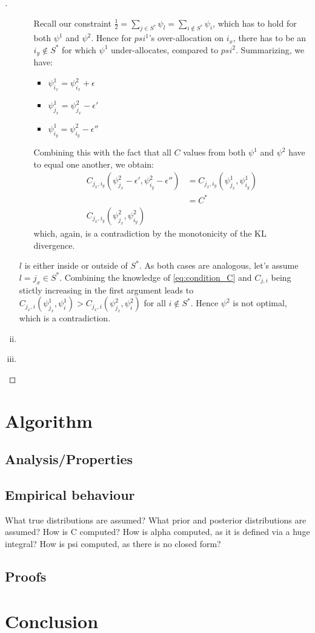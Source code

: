 \begin{proof}[]
\begin{enumerate}[(i)]
\begin{itemize}
      Recall our constraint $\frac{1}{2} = \sum_{j \in S^*} \psi_l = \sum_{i \notin S^*} \psi_i$, which has to hold for both $\psi^1$ and $\psi^2$.
      Hence for $psi^1$'s over-allocation on $i_x$, there has to be an $i_y \notin S^*$ for which $\psi^1$ under-allocates, compared to $psi^2$.
      Summarizing, we have:
      \begin{itemize}
        \item $\psi^1_{i_x} = \psi^2_{i_x} + \epsilon$
        \item $\psi^1_{j_x} = \psi^2_{j_x} - \epsilon'$
        \item $\psi^1_{i_y} = \psi^2_{i_y} - \epsilon''$
      \end{itemize}
      Combining this with the fact that all $C$ values from both $\psi^1$ and $\psi^2$ have to equal one another, we obtain:
      \begin{align}
        C_{j_x, i_y}(\psi^2_{j_x} - \epsilon', \psi^2_{i_y} - \epsilon'') &= C_{j_x, i_y}(\psi^1_{j_x}, \psi^1_{i_y}) \\
        &= C^* \\
        C_{j_x, i_y}(\psi^2_{j_x}, \psi^2_{i_y})
      \end{align}
      which, again, is a contradiction by the monotonicity of the KL divergence.
    \end{itemize}

    $l$ is either inside or outside of $S^*$. As both cases are analogous, let's assume $l = j_x \in S^*$. Combining the knowledge of \eqref{eq:condition_C} and $C_{j, i}$ being stictly increasing in the first argument leads to $C_{j_x, i}(\psi^1_{j_x}, \psi^1_i) > C_{j_x, i}(\psi^2_{j_x}, \psi^2_i)$ for all $i \notin S^*$. Hence $\psi^2$ is not optimal, which is a contradiction.

  \item \label{itm:p7_iii}
  \item \label{itm:p7_iv}
  \end{enumerate}

\end{proof}

\chapter{Algorithm}
\section{Analysis/Properties}
\section{Empirical behaviour}\label{section:empirical_behaviour}
What true distributions are assumed?
What prior and posterior distributions are assumed?
How is C computed?
How is alpha computed, as it is defined via a huge integral?
How is psi computed, as there is no closed form?
\section{Proofs}

\chapter{Conclusion}
